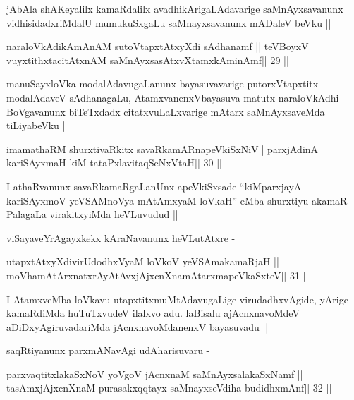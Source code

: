 \begin{artha}
jAbAla shAKeyalilx kamaRdalilx avadhikArigaLAdavarige saMnAyxsavanunx
vidhisidadxriMdalU mumukuSxgaLu saMnayxsavanunx mADaleV beVku ||
\end{artha}

\begin{shl}
naraloVkAdikAmAnAM sutoVtapxtAtxyXdi sAdhanamf ||
teVBoyxV vuyxtithxtacitAtxnAM saMnAyxsasAtxvXtamxkAminAmf\hfill || 29 ||
\end{shl}

\begin{artha}
manuSayxloVka modalAdavugaLanunx bayasuvavarige putorxVtapxtitx
modalAdaveV sAdhanagaLu, AtamxvanenxVbayasuva matutx naraloVkAdhi
BoVgavanunx biTeTxdadx citatxvuLaLxvarige mAtarx saMnAyxsaveMda
tiLiyabeVku |
\end{artha}

\begin{shl}
imamathaRM shurxtivaRkitx savaRkamARnapeVkiSxNiV||
parxjAdinA kariSAyxmaH kiM tataPxlavitaqSeNxVtaH\hfill || 30 ||
\end{shl}

\begin{artha}
I athaRvanunx savaRkamaRgaLanUnx apeVkiSxsade ``kiMparxjayA
kariSAyxmoV yeVSAMnoV\s ya mAtAmxyaM loVkaH'' eMba shurxtiyu akamaR
PalagaLa virakitxyiMda  heVLuvudud ||
\end{artha}

\begin{artha}
viSayaveYrAgayxkekx kAraNavanunx heVLutAtxre -
\end{artha}

\begin{shl}
utapxtAtxyXdivirUdodhxV\s yaM loVkoV yeVSAmakamaRjaH ||
moVhamAtArxnatxrAyAtAvxjAjxcnXnamAtarxmapeVkaSxteV\hfill || 31 ||
\end{shl}

\begin{artha}
I AtamxveMba loVkavu utapxtitxmuMtAdavugaLige virudadhxvAgide, yArige
kamaRdiMda huTuTxvudeV ilalxvo adu. laBisalu ajAcnxnavoMdeV
aDiDxyAgiruvadariMda jAcnxnavoMdanenxV bayasuvadu ||

saqRtiyanunx parxmANavAgi udAharisuvaru -
\end{artha}

\begin{shl}
parxvaqtitxlakaSxNoV yoVgoV jAcnxnaM saMnAyxsalakaSxNamf ||
tasAmxjAjxcnXnaM purasakxqqtayx saMnayxseVdiha budidhxmAnf\hfill || 32 ||
\end{shl}

